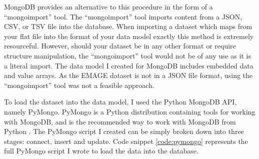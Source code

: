 MongoDB provides an alternative to this procedure in the form of a ``mongoimport'' tool. The ``mongoimport'' tool imports content from a JSON, CSV, or TSV file into the database. When importing a dataset which maps from your flat file into the format of your data model exactly this method is extremely resourceful. However, should your dataset be in any other format or require structure manipulation, the ``mongoimport'' tool would not be of any use as it is a literal import. The data model I created for MongoDB includes embedded data and value arrays. As the EMAGE dataset is not in a JSON file format, using the ``mongoimport'' tool was not a feasible approach.

To load the dataset into the data model, I used the Python MongoDB API, namely PyMongo. PyMongo is a Python distribution containing tools for working with MongoDB, and is the recommended way to work with MongoDB from Python \cite{md}. The PyMongo script I created can be simply broken down into three stages: connect, insert and update. Code snippet \ref{code:pymongo} represents the full PyMongo script I wrote to load the data into the database.\\[2em]

